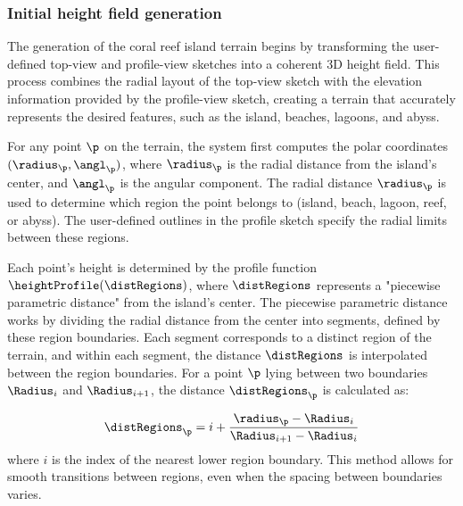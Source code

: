 \subsubsection{Initial height field generation}
The generation of the coral reef island terrain begins by transforming the user-defined top-view and profile-view sketches into a coherent 3D height field. This process combines the radial layout of the top-view sketch with the elevation information provided by the profile-view sketch, creating a terrain that accurately represents the desired features, such as the island, beaches, lagoons, and abyss.

For any point $\p$ on the terrain, the system first computes the polar coordinates $(\radius_\p, \angl_\p)$, where $\radius_\p$ is the radial distance from the island's center, and $\angl_\p$ is the angular component. The radial distance $\radius_\p$ is used to determine which region the point belongs to (island, beach, lagoon, reef, or abyss). The user-defined outlines in the profile sketch specify the radial limits between these regions.

Each point's height is determined by the profile function $\heightProfile(\distRegions)$, where $\distRegions$ represents a "piecewise parametric distance" from the island's center. The piecewise parametric distance works by dividing the radial distance from the center into segments, defined by these region boundaries. Each segment corresponds to a distinct region of the terrain, and within each segment, the distance $\distRegions$ is interpolated between the region boundaries. For a point $\p$ lying between two boundaries $\Radius_{i}$ and $\Radius_{i+1}$, the distance $\distRegions_\p$ is calculated as:

\begin{align}
    \distRegions_\p = i + \frac{\radius_\p - \Radius_{i}}{\Radius_{i + 1} - \Radius_{i}}
\end{align}
where $i$ is the index of the nearest lower region boundary. This method allows for smooth transitions between regions, even when the spacing between boundaries varies. 


